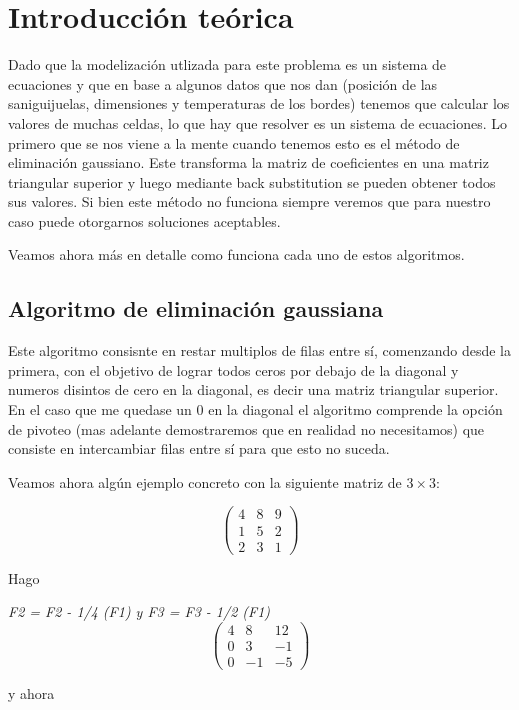\section{Introducci\'on te\'orica}

Dado que la modelización utlizada para este problema es un sistema de ecuaciones y que en base a algunos datos que nos dan (posición de las saniguijuelas, dimensiones y temperaturas de los bordes) tenemos que calcular los valores de muchas celdas, lo que hay que resolver es un sistema de ecuaciones. 
Lo primero que se nos viene a la mente cuando tenemos esto es el método de eliminación gaussiano. Este transforma la matriz de coeficientes en una matriz triangular superior y luego mediante back substitution 
se pueden obtener todos sus valores. Si bien este método no funciona siempre veremos que para nuestro caso puede otorgarnos soluciones aceptables.

Veamos ahora más en detalle como funciona cada uno de estos algoritmos.

\subsection{Algoritmo de eliminación gaussiana}

Este algoritmo consisnte en restar multiplos de filas entre sí, comenzando desde la primera, con el objetivo de lograr todos ceros por debajo de la diagonal y numeros disintos de cero en la diagonal, 
es decir una matriz triangular superior. En el caso que me quedase un 0 en la diagonal el algoritmo comprende la opción de pivoteo (mas adelante demostraremos que en realidad no necesitamos) que consiste en intercambiar 
filas entre sí para que esto no suceda.

Veamos ahora algún ejemplo concreto con la siguiente matriz de $3 \times 3$:

\[ \left( \begin{array}{ccc}
4 & 8 & 9 \\
1 & 5 & 2 \\
2 & 3 & 1 \end{array} \right)\] 

Hago 

\emph{F2 = F2 - 1/4 (F1) y F3 = F3 - 1/2 (F1)} 
\[ \left( \begin{array}{ccc}
4 & 8 & 12 \\
0 & 3 & -1 \\
0 & -1 & -5 \end{array} \right)\] 

y ahora

